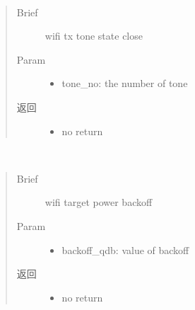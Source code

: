 \documentclass[letterpaper,10pt,english]{sphinxhowto}
\begin{document}
\begin{fulllineitems}
\begin{fulllineitems}
\end{fulllineitems}


\begin{fulllineitems}
\label{\detokenize{rfapi/index:wifi_api.WIFIAPI.stoptone}}~\begin{quote}\begin{description}
\item[{Brief}] \leavevmode
wifi tx tone state close

\item[{Param}] \leavevmode\begin{itemize}
\item {} 
tone\_no:  the number of tone

\end{itemize}

\item[{返回}] \leavevmode
\begin{itemize}
\item {} 
no return

\end{itemize}


\end{description}\end{quote}

\end{fulllineitems}


\begin{fulllineitems}
\label{\detokenize{rfapi/index:wifi_api.WIFIAPI.target_power_backoff}}~\begin{quote}\begin{description}
\item[{Brief}] \leavevmode
wifi target power backoff

\item[{Param}] \leavevmode\begin{itemize}
\item {} 
backoff\_qdb: value of backoff

\end{itemize}

\item[{返回}] \leavevmode
\begin{itemize}
\item {} 
no return


\end{itemize}
\end{description}
\end{quote}
\end{fulllineitems}
\end{fulllineitems}
\end{document}
